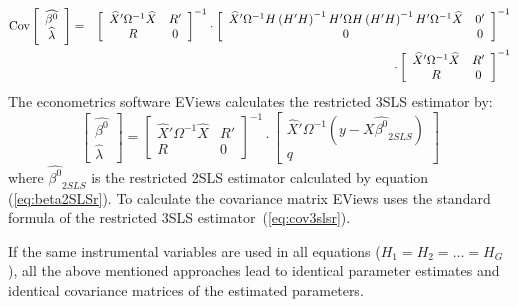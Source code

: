 \begin{eqnarray}
   \text{Cov} 
   \left[ \begin{array}{c}
      \widehat{\beta^0} \\ \widehat{\lambda}
   \end{array} \right] 
   & = & 
   \left[ \begin{array}{cc}
      \widehat{X}' \Omega^{-1} \widehat{X} & R' \\ 
      R & 0
   \end{array} \right]^{-1}
   \cdot
   \left[ \begin{array}{cc}
      \widehat{X}' \Omega^{-1} H \left( H' H \right)^{-1} H' \Omega
      H \left( H' H \right)^{-1} H' \Omega^{-1} \widehat{X} & 0' \\ 
      0 & 0
   \end{array} \right]^{-1}
   \nonumber \\
   & & \cdot
   \left[ \begin{array}{cc}
      \widehat{X}' \Omega^{-1} \widehat{X} & R' \\ 
      R & 0
   \end{array} \right]^{-1}
\end{eqnarray}
The econometrics software EViews calculates the restricted 3SLS estimator by:
\begin{equation}
   \left[ \begin{array}{c}
      \widehat{\beta^0} \\ \widehat{\lambda}
   \end{array} \right]
   =
   \left[ \begin{array}{cc}
      \widehat{X}' \Omega^{-1} \widehat{X} & R' \\ 
      R & 0
   \end{array} \right]^{-1}
   \cdot
   \left[ \begin{array}{c}
      \widehat{X}' \Omega^{-1} \left( y - X \widehat{\beta^0}_{2SLS} \right) 
      \\ q 
   \end{array} \right]
   \label{eq:3slsEViewsR}
\end{equation}
where $\widehat{\beta^0}_{2SLS}$ is the restricted 2SLS estimator calculated
by equation (\ref{eq:beta2SLSr}). 
To calculate the covariance matrix
EViews uses the standard formula of the restricted 3SLS
estimator~(\ref{eq:cov3slsr}).


If the same instrumental variables are used in all equations 
($H_1 = H_2 = \ldots = H_G$), 
all the above mentioned approaches lead to identical parameter estimates
and identical covariance matrices of the estimated parameters.

